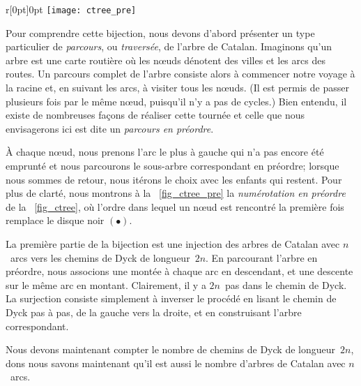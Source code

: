 \begin{wrapfigure}[7]{r}[0pt]{0pt}
\centering
\texttt{[image: ctree\_pre]}
\caption{\label{fig_ctree_pre}}
\end{wrapfigure}
Pour comprendre cette bijection, nous devons d'abord présenter un type
particulier de \emph{parcours}, ou
\emph{traversée}, de l'arbre de
Catalan. Imaginons qu'un arbre est une carte routière où les n{\oe}uds
dénotent des villes et les arcs des routes. Un parcours complet de
l'arbre consiste alors à commencer notre voyage à la racine et, en
suivant les arcs, à visiter tous les n{\oe}uds. (Il est permis de
passer plusieurs fois par le même n{\oe}ud, puisqu'il n'y a pas de
cycles.) Bien entendu, il existe de nombreuses façons de réaliser
cette tournée et celle que nous envisagerons ici est dite un
\emph{parcours en préordre}.

À chaque n{\oe}ud, nous prenons l'arc le plus à gauche qui n'a pas
encore été emprunté et nous parcourons le sous-arbre correspondant en
préordre; lorsque nous sommes de retour, nous itérons le choix avec
les enfants qui restent. Pour plus de clarté, nous montrons à la
\fig~\ref{fig_ctree_pre} la \emph{numérotation en
  préordre} de
la \fig~\ref{fig_ctree}, où l'ordre dans lequel un n{\oe}ud est
rencontré la première fois remplace le disque noir \((\bullet)\).

La première partie de la bijection est une injection des arbres de
Catalan avec \(n\)~arcs vers les chemins de Dyck de
longueur~\(2n\). En parcourant l'arbre en préordre, nous associons une
montée à chaque arc en descendant, et une descente sur le même arc en
montant. Clairement, il y a \(2n\)~pas dans le chemin de Dyck. La
surjection consiste simplement à inverser le procédé en lisant le
chemin de Dyck pas à pas, de la gauche vers la droite, et en
construisant l'arbre correspondant.

Nous devons maintenant compter le nombre de chemins de Dyck de
longueur~\(2n\), dons nous savons maintenant qu'il est aussi le nombre
d'arbres de Catalan avec \(n\)~arcs.


